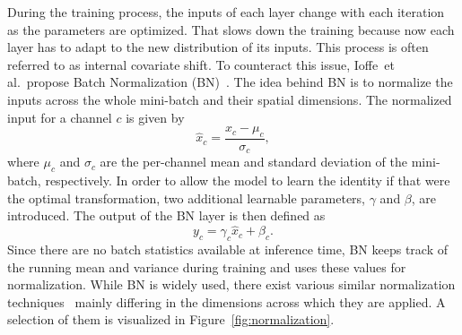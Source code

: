 During the training process, the inputs of each layer change with each iteration as the parameters are optimized.
That slows down the training because now each layer has to adapt to the new distribution of its inputs. This process is often referred to as internal covariate shift.
To counteract this issue, Ioffe~et al.\ propose Batch Normalization (BN)~\cite{BatchNorm}.
The idea behind BN is to normalize the inputs across the whole mini-batch and their spatial dimensions.
The normalized input for a channel $c$ is given by
\begin{equation}
    \hat{x}_c = \frac{x_c - \mu_c}{\sigma_c},
\end{equation} 
where $\mu_c$ and $\sigma_c$ are the per-channel mean and standard deviation of the mini-batch, respectively.  
In order to allow the model to learn the identity if that were the optimal transformation, two additional learnable parameters, $\gamma$ and $\beta$, are introduced. The output of the BN layer is then defined as
\begin{equation}
    y_c = \gamma_c\hat{x}_c + \beta_c.
\end{equation}
Since there are no batch statistics available at inference time, BN keeps track of the running mean and variance during training and uses these values for normalization.
While BN is widely used, there exist various similar normalization techniques~\cite{LayerNorm, InstanceNorm, GroupNorm} mainly differing in the dimensions across which they are applied.
A selection of them is visualized in Figure~\ref{fig:normalization}.

